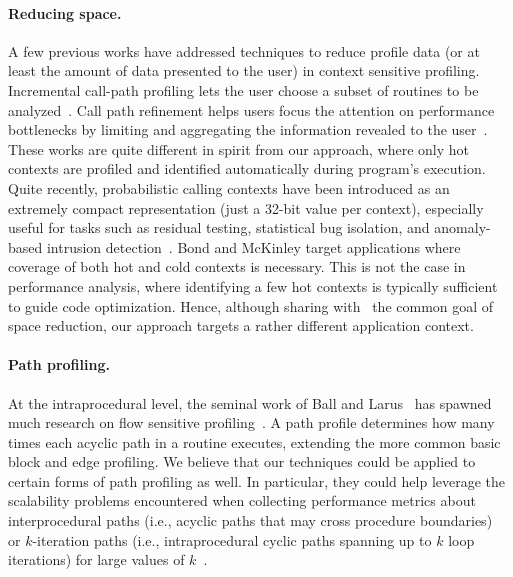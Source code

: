 \documentclass[preprint]{sigplanconf}
\begin{document}
\vspace{-1mm}
\paragraph{Reducing space.} A few previous works have addressed techniques to reduce profile data (or at least the amount of data presented to the user) in context sensitive profiling. Incremental call-path profiling lets the user choose a subset of routines to be analyzed~\cite{BM04}. Call path refinement helps users focus the attention on performance bottlenecks by limiting and aggregating the information revealed to the user~\cite{H95}. These works are quite different in spirit from our approach, where only hot contexts are profiled and identified automatically during program's execution. Quite recently, probabilistic calling contexts have been introduced as an extremely compact representation (just a 32-bit value per context), especially useful for tasks such as residual testing, statistical bug isolation, and anomaly-based intrusion detection~\cite{BM07}. Bond and McKinley target applications where coverage of both hot and cold contexts is necessary. This is not the case in performance analysis, where identifying a few hot contexts is typically sufficient to guide code optimization. Hence, although sharing with~\cite{BM07} the common goal of space reduction, our approach targets a rather different application context.

\vspace{-1mm}
\paragraph{Path profiling.} At the intraprocedural level,  the seminal work of Ball and Larus~\cite{BL96} has spawned much research on flow sensitive profiling~\cite{ABL97, BMS98, L99, AH02, AL04, JBZ04, VNC07, BM05, BM05b}. A path profile determines how many times each acyclic path in a routine executes, extending the more common basic block and edge profiling. We believe that our techniques could be applied to certain forms of path profiling as well. In particular, they could help leverage the scalability problems encountered when collecting performance metrics about interprocedural paths (i.e., acyclic paths that may cross procedure boundaries)~\cite{MR99} or $k$-iteration paths (i.e., intraprocedural cyclic paths spanning up to $k$ loop iterations) for large values of $k$~\cite{SS09}.





\softraggedright

\vspace{-2mm}

\end{document}
